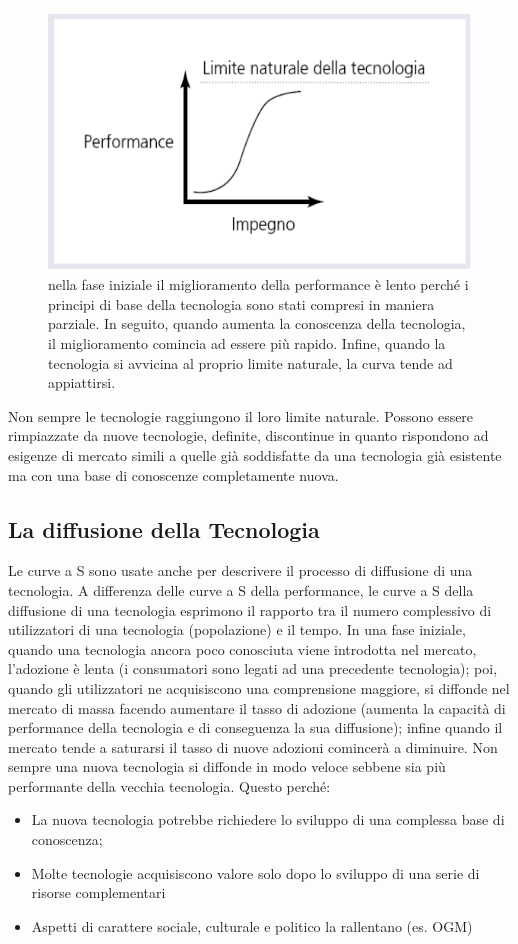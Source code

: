 \documentclass{article}
\begin{document}
\begin{figure}[h!]
	\centering
	\includegraphics[scale=0.3]{images/curva_S.png}
	\caption{nella fase iniziale il miglioramento della performance è lento perché i principi di base della tecnologia sono stati compresi in maniera parziale. In seguito, quando aumenta la conoscenza della tecnologia, il miglioramento comincia ad essere più rapido. Infine, quando la tecnologia si avvicina al proprio limite naturale, la curva tende ad appiattirsi.}
	\label{fig:curva_S}
\end{figure}

Non sempre le tecnologie raggiungono il loro limite naturale.
Possono essere rimpiazzate da nuove tecnologie, definite, discontinue in quanto rispondono ad esigenze di mercato simili a quelle già soddisfatte da una tecnologia già esistente ma con una base di conoscenze completamente nuova.

\subsection{La diffusione della Tecnologia} 
Le curve a S sono usate anche per descrivere il processo di diffusione di una tecnologia. A
differenza delle curve a S della performance, le curve a S della diffusione di una tecnologia
esprimono il rapporto tra il numero complessivo di utilizzatori di una tecnologia (popolazione) e il
tempo.
In una fase iniziale, quando una tecnologia ancora poco conosciuta viene introdotta nel mercato,
l’adozione è lenta (i consumatori sono legati ad una precedente tecnologia); poi, quando gli
utilizzatori ne acquisiscono una comprensione maggiore, si diffonde nel mercato di massa facendo
aumentare il tasso di adozione (aumenta la capacità di performance della tecnologia e di
conseguenza la sua diffusione); infine quando il mercato tende a saturarsi il tasso di nuove
adozioni comincerà a diminuire.
Non sempre una nuova tecnologia si diffonde in modo veloce sebbene sia più performante della
vecchia tecnologia. Questo perché:
\begin{itemize}
	\item La nuova tecnologia potrebbe richiedere lo sviluppo di una complessa base di conoscenza;
	\item Molte tecnologie acquisiscono valore solo dopo lo sviluppo di una serie di risorse
	complementari
	\item Aspetti di carattere sociale, culturale e politico la rallentano (es. OGM)
\end{itemize}
\end{document}
